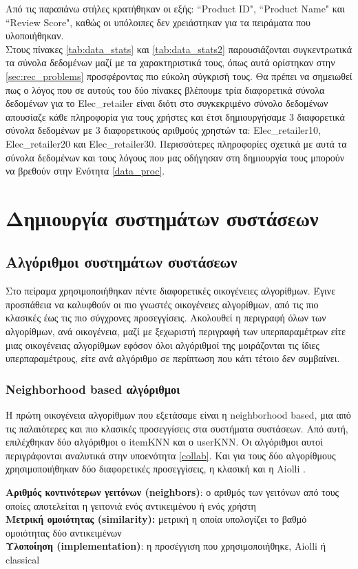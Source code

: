 Από τις παραπάνω στήλες κρατήθηκαν οι εξής: ``Product ID", ``Product Name" και ``Review Score", καθώς οι υπόλοιπες δεν χρειάστηκαν για τα πειράματα που υλοποιήθηκαν.\\
Στους πίνακες \ref{tab:data_stats} και \ref{tab:data_stats2} παρουσιάζονται συγκεντρωτικά τα σύνολα δεδομένων μαζί με τα χαρακτηριστικά τους, όπως αυτά ορίστηκαν στην  \autoref{sec:rec_problems} προσφέροντας πιο εύκολη σύγκρισή τους. Θα πρέπει να σημειωθεί πως ο λόγος που σε αυτούς του δύο πίνακες βλέπουμε τρία διαφορετικά σύνολα δεδομένων για το Elec\_retailer είναι διότι στο συγκεκριμένο σύνολο δεδομένων απουσίαζε κάθε πληροφορία για τους χρήστες και έτσι δημιουργήσαμε 3 διαφορετικά σύνολα δεδομένων με 3 διαφορετικούς αριθμούς χρηστών τα: Elec\_retailer10, Elec\_retailer20 και Elec\_retailer30. Περισσότερες πληροφορίες σχετικά με αυτά τα σύνολα δεδομένων και τους λόγους που μας οδήγησαν στη δημιουργία τους μπορούν να βρεθούν στην Ενότητα \ref{data_proc}.
\section{Δημιουργία συστημάτων συστάσεων}
\subsection{Αλγόριθμοι συστημάτων συστάσεων}
\noindent Στο πείραμα χρησιμοποιήθηκαν πέντε διαφορετικές οικογένειες αλγορίθμων. Έγινε προσπάθεια να καλυφθούν οι πιο γνωστές οικογένειες αλγορίθμων, από τις πιο κλασικές έως τις πιο σύγχρονες προσεγγίσεις. Ακολουθεί η περιγραφή όλων των αλγορίθμων, ανά οικογένεια, μαζί με ξεχωριστή περιγραφή των υπερπαραμέτρων είτε μιας οικογένειας αλγορίθμων εφόσον όλοι αλγόριθμοί της μοιράζονται τις ίδιες υπερπαραμέτρους, είτε ανά αλγόριθμο σε περίπτωση που κάτι τέτοιο δεν συμβαίνει.
\subsubsection{Neighborhood based αλγόριθμοι}
\noindent Η πρώτη οικογένεια αλγορίθμων που εξετάσαμε είναι η neighborhood based, μια από τις παλαιότερες και πιο κλασικές προσεγγίσεις στα συστήματα συστάσεων. Από αυτή, επιλέχθηκαν δύο αλγόριθμοι ο itemKNN και ο userKNN. Οι αλγόριθμοι αυτοί περιγράφονται αναλυτικά στην υποενότητα \ref{collab}. Και για τους δύο αλγορίθμους χρησιμοποιήθηκαν δύο διαφορετικές προσεγγίσεις, η κλασική και η Aiolli \cite{aiolliEfficientTopnRecommendation2013}.
\begin{tcolorbox}[
	colframe=blue!25,
	colback=blue!10,
	coltitle=blue!20!black,  
	fonttitle=\bfseries,
	adjusted title= Υπερπαράμετροι]
	\textbf{Αριθμός κοντινότερων γειτόνων (neighbors)}: ο αριθμός των γειτόνων από τους οποίες αποτελείται η γειτονιά ενός αντικειμένου ή ενός χρήστη\\
	\textbf{Μετρική ομοιότητας (similarity):} μετρική η οποία υπολογίζει το βαθμό ομοιότητας δύο αντικειμένων\\
	\textbf{Υλοποίηση (implementation)}: η προσέγγιση που χρησιμοποιήθηκε, Aiolli ή classical
\end{tcolorbox}
 
